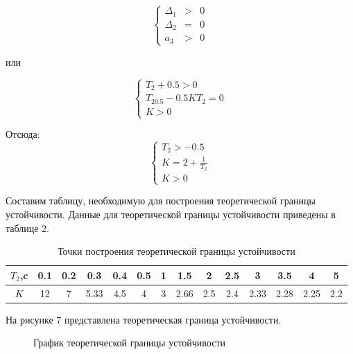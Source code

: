 \documentclass[a4paper, 11pt]{article}
\begin{document}
\begin{equation}
\left\{
\begin{matrix}
\Delta_1 & > & 0 \\
\Delta_2 & = & 0 \\
a_3 & > & 0
\end{matrix}
\right. 
\end{equation}
 
\par 
или

\begin{equation}
\left\{
\begin{matrix}
T_2+0.5>0 \\
T_20.5-0.5KT_2=0 \\
K>0
\end{matrix}
\right. 
\end{equation}

\par 
Отсюда:
\begin{equation}
\left\{
\begin{matrix}
T_2>-0.5 \\
\displaystyle K=2+\frac{1}{T_2} \\
K>0
\end{matrix}
\right. 
\end{equation}

\par 
Составим таблицу, необходимую для построения теоретической границы устойчивости. Данные для теоретической границы устойчивости приведены в таблице 2.

\begin{table}
\centering
\begin{threeparttable}
\caption{Точки построения теоретической границы устойчивости}\label{tab:perflogcross}
\begin{tabular}{|c|c|c|c|c|c|c|c|c|c|c|c|c|c|}
\hline
$T_2$,c & 0.1 & 0.2 & 0.3 & 0.4 & 0.5 & 1 & 1.5 & 2 & 2.5 & 3 & 3.5 & 4 & 5 \\
\hline
$K$ & 12 & 7 & 5.33 & 4.5 & 4 & 3 & 2.66 & 2.5 & 2.4 & 2.33 & 2.28 & 2.25 & 2.2\\
\hline
\end{tabular}
\end{threeparttable}
\end{table}

\par 
На рисунке 7 представлена теоретическая граница устойчивости.

\begin{figure}[h!]
\centering
{}
\caption{График теоретической границы устойчивости}
\end{figure}
\end{document}
